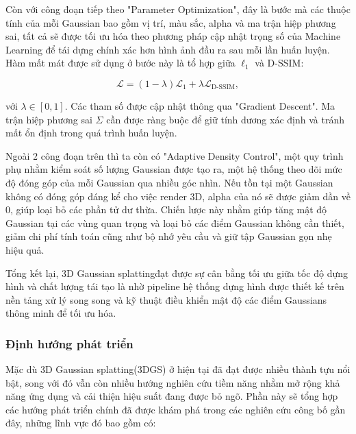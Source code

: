         
        Còn với công đoạn tiếp theo "Parameter Optimization", đây là bước mà các thuộc tính của mỗi Gaussian bao gồm vị trí, màu sắc, alpha và ma trận hiệp phương sai, tất cả sẽ được tối ưu hóa theo phương pháp cập nhật trọng số của Machine Learning để tái dựng chính xác hơn hình ảnh đầu ra sau mỗi lần huấn luyện. Hàm mất mát được sử dụng ở bước này là tổ hợp giữa $\ell_1$ và D-SSIM:
        
        \[
        \mathcal{L} = (1 - \lambda)\mathcal{L}_1 + \lambda \mathcal{L}_{\text{D-SSIM}},
        \]
        
        với $\lambda \in [0, 1]$. Các tham số được cập nhật thông qua "Gradient Descent". Ma trận hiệp phương sai $\Sigma$ cần được ràng buộc để giữ tính dương xác định và tránh mất ổn định trong quá trình huấn luyện.
        
        Ngoài 2 công đoạn trên thì ta còn có "Adaptive Density Control", một quy trình phụ nhằm kiểm soát số lượng Gaussian được tạo ra, một hệ thống theo dõi mức độ đóng góp của mỗi Gaussian qua nhiều góc nhìn. Nếu tồn tại một Gaussian không có đóng góp đáng kể cho việc render 3D, alpha của nó sẽ được giảm dần về 0, giúp loại bỏ các phần tử dư thừa. Chiến lược này nhằm giúp tăng mật độ Gaussian tại các vùng quan trọng và loại bỏ các điểm Gaussian không cần thiết, giảm chi phí tính toán cũng như bộ nhớ yêu cầu và giữ tập Gaussian gọn nhẹ hiệu quả.
        
        \medskip
        
        Tổng kết lại, 3D Gaussian splattingđạt được sự cân bằng tối ưu giữa tốc độ dựng hình và chất lượng tái tạo là nhờ pipeline hệ thống dựng hình được thiết kế trên nền tảng xử lý song song và kỹ thuật điều khiển mật độ các điểm Gaussians thông minh để tối ưu hóa. \\
        
        \subsubsection{Định hướng phát triển}

        Mặc dù 3D Gaussian splatting(3DGS) ở hiện tại đã đạt được nhiều thành tựu nổi bật, song với đó vẫn còn nhiều hướng nghiên cứu tiềm năng nhằm mở rộng khả năng ứng dụng và cải thiện hiệu suất đang được bỏ ngõ. Phần này sẽ tổng hợp các hướng phát triển chính đã được khám phá trong các nghiên cứu công bố gần đây, những lĩnh vực đó bao gồm có:\\

